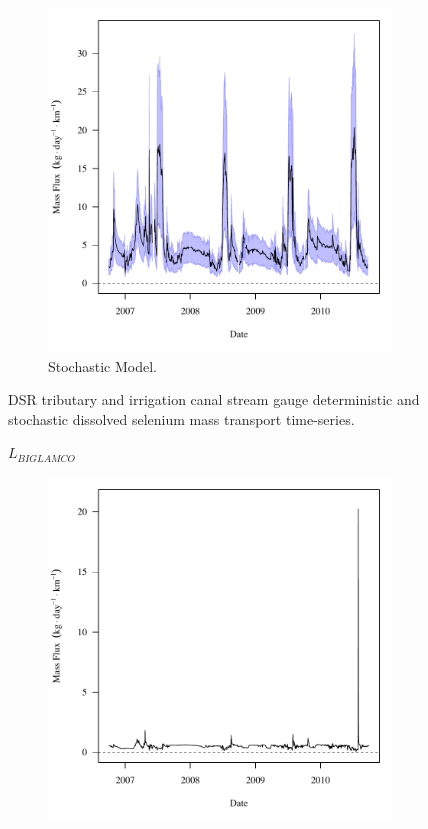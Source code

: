 \begin{linenumbers}
\begin{landscape}
\begin{figure}
\begin{subfigure}{0.7\textwidth}
			\includegraphics[width=\tableCustomSize]{"Figures/Results_DSR/Stochastic/f D106C"}
			\caption{Stochastic Model.}
		\end{subfigure}
		\caption{DSR tributary and irrigation canal stream gauge deterministic and stochastic dissolved selenium mass transport time-series.}
	\end{figure}
\end{landscape}
\subfiguremid
\begin{landscape}
	\begin{figure}
		$ \displaystyle L_{BIGLAMCO} $
		\begin{subfigure}{0.7\textwidth}
			\centering
			\includegraphics[width=\tableCustomSize]{"Figures/Results_DSR/Deterministic/f BIG"}

\end{subfigure}
\end{figure}
\end{landscape}
\end{linenumbers}
